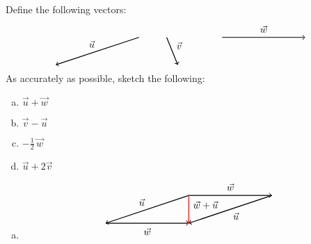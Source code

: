 \documentclass[12pt,letterpaper]{exam}
\begin{document}
\examtitle
{} 
\scores
\bottomline
\newpage

\begin{questions}

\newpage
\question[10] Define the following vectors:
	\[
	\begin{tikzpicture}
	\node at (-1.7,-0.25) {$\vec{u}$};
	\draw[line width=0.03cm,->] (0,0) -- (-3,-1);
	
	\tikzset{shift={(1,0)}}
	
	\node at (0.45,-0.3) {$\vec{v}$};
	\draw[line width=0.03cm,->] (0,0) -- (0.4,-1);
	
	\tikzset{shift={(2,0)}}
	
	\node at (1.5,0.3) {$\vec{w}$};
	\draw[line width=0.03cm,->] (0,0) -- (3,0);
	\end{tikzpicture}
	\]
As accurately as possible, sketch the following:
	\begin{enumerate}[(a)]
	\item $\vec{u} + \vec{w}$
	\item $\vec{v} - \vec{u}$
	\item $-\frac{1}{2}\, \vec{w}$
	\item $\vec{u} + 2 \vec{v}$
	\end{enumerate} \pspace

\sol 
\begin{enumerate}[(a)]
\item 
	\[
	\begin{tikzpicture}
	\node at (1.7,-0.75) {$\vec{u}$};
	\node at (1.5,0.3) {$\vec{w}$};
	\draw[line width=0.03cm,->] (0,0) -- (-3,-1);
	\draw[line width=0.03cm,->] (-3,-1) -- (0,-1);
	
	\node at (-1.5,-1.3) {$\vec{w}$};
	\node at (-1.7,-0.25) {$\vec{u}$};
	\draw[line width=0.03cm,->] (0,0) -- (3,0);
	\draw[line width=0.03cm,->] (3,0) -- (0,-1);
	
	\node at (0.6,-0.35) {$\vec{w} + \vec{u}$};
	\draw[line width=0.03cm,->,red] (0,0) -- (0,-1);
	\end{tikzpicture}
	\]


\end{enumerate}
\end{questions}
\end{document}
